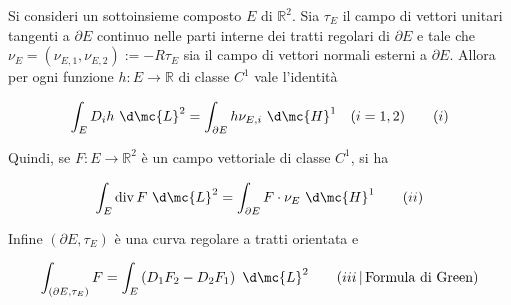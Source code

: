 \begin{shadedTheorem}\label{thm: 2.13 Gauss 2D}
    Si consideri un sottoinsieme composto $E$ di $\mathbb{R}^{2}$. Sia $\tau_{E}$ il campo di vettori unitari tangenti a $\partial E$ continuo nelle parti interne dei tratti regolari di $\partial E$ e tale che $\nu_{E}=\left(\nu_{E, 1}, \nu_{E, 2}\right):=-R \tau_{E}$ sia il campo di vettori normali esterni a $\partial E$. Allora per ogni funzione $h: E \rightarrow \mathbb{R}$ di classe $C^{1}$ vale l'identità

    \[
    \int_{E} D_{i} h\ \d \mc{L}^{2}=\int_{\partial E} h \nu_{E, i}\ \d \mc{H}^{1} \quad(i=1,2)\tag{$i$}
    \]

    Quindi, se $F: E \rightarrow \mathbb{R}^{2}$ è un campo vettoriale di classe $C^{1}$, si ha

    \[
    \int_{E} \operatorname{div} F\ \d \mc{L}^{2}=\int_{\partial E} F \cdot \nu_{E}\ \d \mc{H}^{1}\tag{$ii$}
    \]

    Infine $\left(\partial E, \tau_{E}\right)$ è una curva regolare a tratti orientata e

    \[
    \int_{\left(\partial E, \tau_{E}\right)} F=\int_{E}\left(D_{1} F_{2}-D_{2} F_{1}\right)\ \d \mc{L}^{2}\tag{$iii$\,|\,Formula di Green}
    \]
\end{shadedTheorem}

